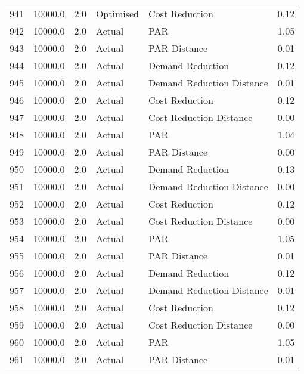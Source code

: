 \begin{longtable}{lrrllr}
941  &      10000.0 &     2.0 &      Optimised &             Cost Reduction &   0.12 \\
942  &      10000.0 &     2.0 &         Actual &                        PAR &   1.05 \\
943  &      10000.0 &     2.0 &         Actual &               PAR Distance &   0.01 \\
944  &      10000.0 &     2.0 &         Actual &           Demand Reduction &   0.12 \\
945  &      10000.0 &     2.0 &         Actual &  Demand Reduction Distance &   0.01 \\
946  &      10000.0 &     2.0 &         Actual &             Cost Reduction &   0.12 \\
947  &      10000.0 &     2.0 &         Actual &    Cost Reduction Distance &   0.00 \\
948  &      10000.0 &     2.0 &         Actual &                        PAR &   1.04 \\
949  &      10000.0 &     2.0 &         Actual &               PAR Distance &   0.00 \\
950  &      10000.0 &     2.0 &         Actual &           Demand Reduction &   0.13 \\
951  &      10000.0 &     2.0 &         Actual &  Demand Reduction Distance &   0.00 \\
952  &      10000.0 &     2.0 &         Actual &             Cost Reduction &   0.12 \\
953  &      10000.0 &     2.0 &         Actual &    Cost Reduction Distance &   0.00 \\
954  &      10000.0 &     2.0 &         Actual &                        PAR &   1.05 \\
955  &      10000.0 &     2.0 &         Actual &               PAR Distance &   0.01 \\
956  &      10000.0 &     2.0 &         Actual &           Demand Reduction &   0.12 \\
957  &      10000.0 &     2.0 &         Actual &  Demand Reduction Distance &   0.01 \\
958  &      10000.0 &     2.0 &         Actual &             Cost Reduction &   0.12 \\
959  &      10000.0 &     2.0 &         Actual &    Cost Reduction Distance &   0.00 \\
960  &      10000.0 &     2.0 &         Actual &                        PAR &   1.05 \\
961  &      10000.0 &     2.0 &         Actual &               PAR Distance &   0.01 \\

\end{longtable}
